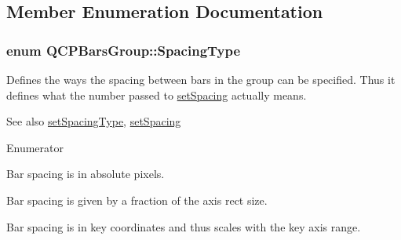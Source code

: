 \subsection{Member Enumeration Documentation}
\subsubsection[{\texorpdfstring{Spacing\+Type}{SpacingType}}]{\setlength{\rightskip}{0pt plus 5cm}enum {\bf Q\+C\+P\+Bars\+Group\+::\+Spacing\+Type}}\hypertarget{classQCPBarsGroup_a4c0521120a97e60bbca37677a37075b6}{}\label{classQCPBarsGroup_a4c0521120a97e60bbca37677a37075b6}
Defines the ways the spacing between bars in the group can be specified. Thus it defines what the number passed to \hyperlink{classQCPBarsGroup_aa553d327479d72a0c3dafcc724a190e2}{set\+Spacing} actually means.

\begin{DoxySeeAlso}{See also}
\hyperlink{classQCPBarsGroup_a2c7e2d61b10594a4555b615e1fcaf49e}{set\+Spacing\+Type}, \hyperlink{classQCPBarsGroup_aa553d327479d72a0c3dafcc724a190e2}{set\+Spacing} 
\end{DoxySeeAlso}
\begin{Desc}
\item[Enumerator]\par
\begin{description}
\item[{\em 
st\+Absolute\hypertarget{classQCPBarsGroup_a4c0521120a97e60bbca37677a37075b6ab53fa3efaf14867dd0f14d41d64e42ac}{}\label{classQCPBarsGroup_a4c0521120a97e60bbca37677a37075b6ab53fa3efaf14867dd0f14d41d64e42ac}
}]Bar spacing is in absolute pixels. \item[{\em 
st\+Axis\+Rect\+Ratio\hypertarget{classQCPBarsGroup_a4c0521120a97e60bbca37677a37075b6ae94b05c27bc985dcdd8b1e1b7f163d26}{}\label{classQCPBarsGroup_a4c0521120a97e60bbca37677a37075b6ae94b05c27bc985dcdd8b1e1b7f163d26}
}]Bar spacing is given by a fraction of the axis rect size. \item[{\em 
st\+Plot\+Coords\hypertarget{classQCPBarsGroup_a4c0521120a97e60bbca37677a37075b6ad369cee6287e0a86e8c2b643a3168c54}{}\label{classQCPBarsGroup_a4c0521120a97e60bbca37677a37075b6ad369cee6287e0a86e8c2b643a3168c54}
}]Bar spacing is in key coordinates and thus scales with the key axis range. \end{description}
\end{Desc}


